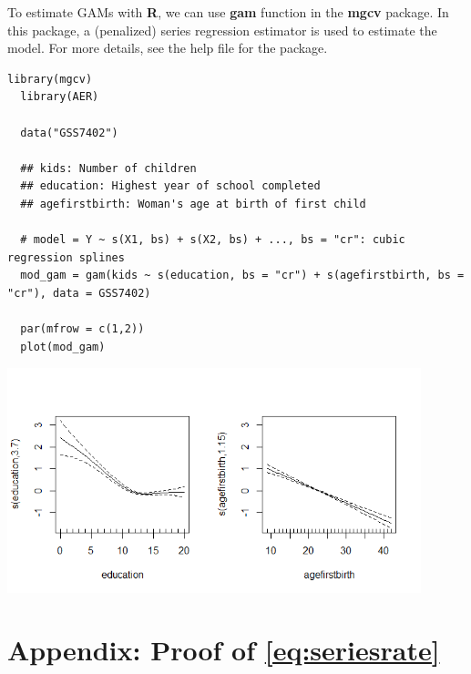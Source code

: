 \documentclass[10.5pt, A4paper, openany, uplatex]{book}
\numberwithin{equation}{section}
\begin{document}
To estimate GAMs with \textbf{R}, we can use \textbf{gam} function in the \textbf{mgcv} package.
In this package, a (penalized) series regression estimator is used to estimate the model.
For more details, see the help file for the package.

\begin{lstlisting}[basicstyle=\ttfamily\footnotesize, frame=single]
  library(mgcv)
  library(AER)
   
  data("GSS7402")
   
  ## kids: Number of children
  ## education: Highest year of school completed
  ## agefirstbirth: Woman's age at birth of first child
   
  # model = Y ~ s(X1, bs) + s(X2, bs) + ..., bs = "cr": cubic regression splines
  mod_gam = gam(kids ~ s(education, bs = "cr") + s(agefirstbirth, bs = "cr"), data = GSS7402)

  par(mfrow = c(1,2))
  plot(mod_gam) 
\end{lstlisting}

\begin{center}
	\includegraphics[width = 12cm]{gam.png}
\end{center}

\section*{Appendix: Proof of \eqref{eq:seriesrate}}
\end{document}
